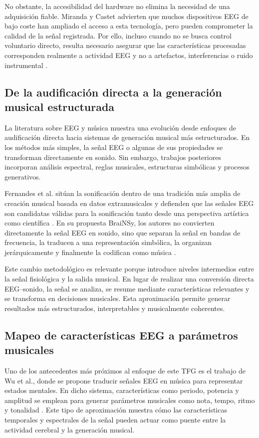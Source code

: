 \documentclass[../main.tex]{subfiles}
\begin{document}
No obstante, la accesibilidad del hardware no elimina la necesidad de una adquisición fiable. Miranda y Castet advierten que muchos dispositivos EEG de bajo coste han ampliado el acceso a esta tecnología, pero pueden comprometer la calidad de la señal registrada. Por ello, incluso cuando no se busca control voluntario directo, resulta necesario asegurar que las características procesadas corresponden realmente a actividad EEG y no a artefactos, interferencias o ruido instrumental \cite{MirandaCastet2014Preface}.

\subsection{De la audificación directa a la generación musical estructurada}

La literatura sobre EEG y música muestra una evolución desde enfoques de audificación directa hacia sistemas de generación musical más estructurados. En los métodos más simples, la señal EEG o algunas de sus propiedades se transforman directamente en sonido. Sin embargo, trabajos posteriores incorporan análisis espectral, reglas musicales, estructuras simbólicas y procesos generativos.

Fernandes et al. sitúan la sonificación dentro de una tradición más amplia de creación musical basada en datos extramusicales y defienden que las señales EEG son candidatas válidas para la sonificación tanto desde una perspectiva artística como científica \cite{Fernandes2021BraiNSy}. En su propuesta BraiNSy, los autores no convierten directamente la señal EEG en sonido, sino que separan la señal en bandas de frecuencia, la traducen a una representación simbólica, la organizan jerárquicamente y finalmente la codifican como música \cite{Fernandes2021BraiNSy}.

Este cambio metodológico es relevante porque introduce niveles intermedios entre la señal fisiológica y la salida musical. En lugar de realizar una conversión directa EEG--sonido, la señal se analiza, se resume mediante características relevantes y se transforma en decisiones musicales. Esta aproximación permite generar resultados más estructurados, interpretables y musicalmente coherentes.

\subsection{Mapeo de características EEG a parámetros musicales}

Uno de los antecedentes más próximos al enfoque de este TFG es el trabajo de Wu et al., donde se propone traducir señales EEG en música para representar estados mentales. En dicho sistema, características como periodo, potencia y amplitud se emplean para generar parámetros musicales como nota, tempo, ritmo y tonalidad \cite{Wu2010}. Este tipo de aproximación muestra cómo las características temporales y espectrales de la señal pueden actuar como puente entre la actividad cerebral y la generación musical.
\end{document}
